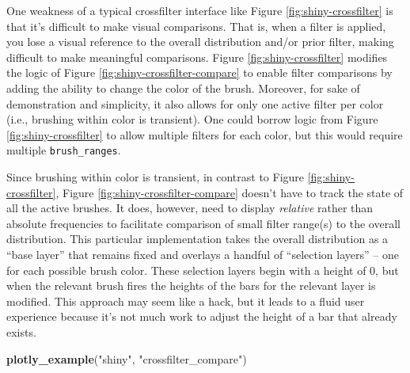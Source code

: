 \documentclass[
  12pt,
]{krantz}
\newenvironment{Shaded}{\begin{snugshade}}{\end{snugshade}}
\newcommand{\KeywordTok}[1]{\textcolor[rgb]{0.13,0.29,0.53}{\textbf{#1}}}
\newcommand{\NormalTok}[1]{#1}
\newcommand{\StringTok}[1]{\textcolor[rgb]{0.31,0.60,0.02}{#1}}
\begin{document}
One weakness of a typical crossfilter interface like Figure \ref{fig:shiny-crossfilter} is that it's difficult to make visual comparisons. That is, when a filter is applied, you lose a visual reference to the overall distribution and/or prior filter, making difficult to make meaningful comparisons. Figure \ref{fig:shiny-crossfilter} modifies the logic of Figure \ref{fig:shiny-crossfilter-compare} to enable filter comparisons by adding the ability to change the color of the brush. Moreover, for sake of demonstration and simplicity, it also allows for only one active filter per color (i.e., brushing within color is transient). One could borrow logic from Figure \ref{fig:shiny-crossfilter} to allow multiple filters for each color, but this would require multiple \texttt{brush\_ranges}.

Since brushing within color is transient, in contrast to Figure \ref{fig:shiny-crossfilter}, Figure \ref{fig:shiny-crossfilter-compare} doesn't have to track the state of all the active brushes. It does, however, need to display \emph{relative} rather than absolute frequencies to facilitate comparison of small filter range(s) to the overall distribution. This particular implementation takes the overall distribution as a ``base layer'' that remains fixed and overlays a handful of ``selection layers'' -- one for each possible brush color. These selection layers begin with a height of 0, but when the relevant brush fires the heights of the bars for the relevant layer is modified. This approach may seem like a hack, but it leads to a fluid user experience because it's not much work to adjust the height of a bar that already exists.

\begin{Shaded}
\begin{Highlighting}[]
\KeywordTok{plotly_example}\NormalTok{(}\StringTok{"shiny"}\NormalTok{, }\StringTok{"crossfilter_compare"}\NormalTok{)}
\end{Highlighting}
\end{Shaded}
\end{document}
